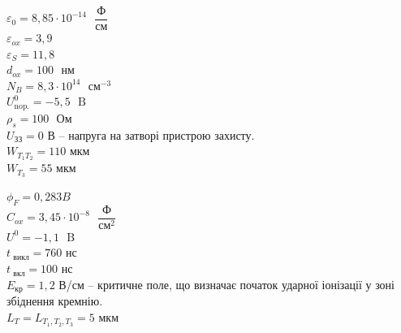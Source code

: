 \documentclass[a4paper,14pt]{extreport}
\begin{document}
\begin{minipage}{0.5\textwidth}
    \begin{flushleft}
  
  $\varepsilon_{0}=8,85 \cdot 10^{-14} \text{ }\dfrac{\text{Ф}}{\text{см}}$\\
  \vspace{0.2cm}
  $\varepsilon_{ox}=3,9$\\
  \vspace{0.2cm}
  $\varepsilon_{S}=11,8$\\
  \vspace{0.2cm}
  $ d_{o x}=100 \text{ } \text{нм}$\\
  \vspace{0.2cm}
  $ N_{B}=8,3 \cdot 10^{14}\text{ } \text{см}^{-3}$\\
  \vspace{0.2cm}
  $ U_{\text{nop.}}^{0}=-5,5 \text{ }\text{B}$\\
  \vspace{0.2cm}
  $ \rho_{s}=100 \text{ }\text{Ом}$\\
  \vspace{0.2 cm}
  $U_{\text{ЗЗ}} = 0 $ В -- напруга на затворі пристрою захисту.\\
  \vspace{0.2 cm}
  $W_{T_1 T_2} = 110 $ мкм\\
  \vspace{0.2 cm}
  $W_{T_3} = 55 $ мкм\\ 


    \end{flushleft}
  \end{minipage}
  \begin{minipage}{0.4\textwidth}
    \begin{flushright}
  
	    $\phi_{F}=0,283 B$\\
	    \vspace{0.2cm}
	    $C_{ox}=3,45 \cdot 10^{-8} \text{ }\dfrac{\text{Ф}}{\text{см}^{2}}$\\
	    \vspace{0.2cm}
	    $U^{0}=-1,1 \text{ }\text{B}$\\
	    \vspace{0.2 cm}
	    $ t_{\text{ викл}} = 760 \text{ нс} $\\
	    \vspace{0.2 cm}
	    $ t_{\text{ вкл}} = 100 \text{ нс} $\\
	    \vspace{0.2 cm}
	    $E_{\text{кр}} = 1,2 $ В/см --  критичне поле, що визначає початок ударної іонізації у зоні збіднення кремнію.\\
	    \vspace{0.2 cm}
		$L_T=L_{T_1,T_2, T_3} = 5 $ мкм\\ 

    \end{flushright}
\end{minipage}
\end{document}
